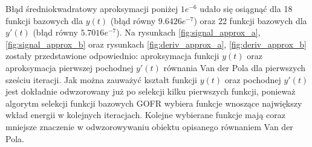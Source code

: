 Błąd średniokwadratowy aproksymacji poniżej $1e^{-6}$ udało się osiągnąć dla 18 funkcji bazowych dla $y(t)$ (błąd równy $9.6426e^{-7}$) oraz 22 funkcji bazowych dla $y'(t)$ (błąd równy $5.7016e^{-7}$). Na rysunkach \ref{fig:signal_approx_a}, \ref{fig:signal_approx_b} oraz rysunkach \ref{fig:deriv_approx_a}, \ref{fig:deriv_approx_b} zostały przedstawione odpowiednio: aproksymacja funkcji $y(t)$ oraz aproksymacja pierwszej pochodnej $y'(t)$ równania Van der Pola  dla pierwszych sześciu iteracji. Jak można zauważyć kształt funkcji $y(t)$ oraz pochodnej $y'(t)$ jest dokładnie odwzorowany już po selekcji kilku pierwszych funkcji, ponieważ algorytm selekcji funkcji bazowych GOFR wybiera funkcje wnoszące największy wkład energii w kolejnych iteracjach. Kolejne wybierane funkcje mają coraz mniejsze znaczenie w odwzorowywaniu obiektu opisanego równaniem Van der Pola.

